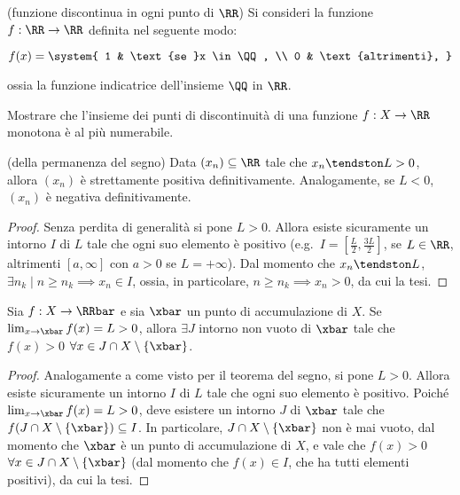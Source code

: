 \documentclass[11pt]{article}
\begin{document}

	\begin{example} (funzione discontinua in ogni punto di $\RR$) Si consideri la funzione $f : \RR \to \RR$ definita
		nel seguente modo:
	
		\[ f(x) = \system{ 1 & \text{se }x \in \QQ, \\ 0 & \text{altrimenti}, } \]
		
		\vskip 0.05in
		
		ossia la funzione indicatrice dell'insieme $\QQ$ in $\RR$.
		
	\end{example}

	\begin{exercise}
		Mostrare che l'insieme dei punti di discontinuità di una funzione $f : X \to \RR$ monotona è al più
		numerabile.
	\end{exercise}

	
	\begin{theorem} (della permanenza del segno)
		Data $(x_n) \subseteq \RR$ tale che $x_n \tendston L > 0$, allora
		$(x_n)$ è strettamente positiva definitivamente. Analogamente, se $L < 0$,
		$(x_n)$ è negativa definitivamente.
	\end{theorem}

	\begin{proof}
		Senza perdita di generalità si pone $L > 0$. Allora esiste sicuramente un intorno $I$ di $L$ tale che ogni suo elemento è positivo (e.g.~$I = [\frac{L}{2}, \frac{3L}{2}]$, se $L \in \RR$, altrimenti $[a, \infty]$ con $a > 0$ se $L = +\infty$). Dal momento che $x_n \tendston L$, $\exists n_k \mid n \geq n_k \implies x_n \in I$,
		ossia, in particolare, $n \geq n_k \implies x_n > 0$, da cui la tesi.
	\end{proof}

	\begin{proposition}
		Sia $f : X \to \RRbar$ e sia $\xbar$ un punto di accumulazione di $X$. Se $\lim_{x \to \xbar} f(x) = L > 0$,
		allora $\exists J$ intorno non vuoto di $\xbar$ tale che $f(x) > 0$ $\forall x \in J \cap X \setminus \{\xbar\}$.
	\end{proposition}

	\begin{proof}
		Analogamente a come visto per il teorema del segno, si pone $L > 0$. Allora esiste sicuramente un intorno $I$ di $L$ tale che ogni suo elemento è positivo. Poiché $\lim_{x \to \xbar} f(x) = L > 0$, deve esistere un intorno $J$ di
		$\xbar$ tale che $f(J \cap X \setminus \{\xbar\}) \subseteq I$. In particolare, $J \cap X \setminus \{\xbar\}$ non
		è mai vuoto, dal momento che $\xbar$ è un punto di accumulazione di $X$, e vale che $f(x) > 0$ $\forall x \in J \cap X \setminus \{\xbar\}$ (dal momento che $f(x) \in I$, che ha tutti elementi positivi), da cui la tesi.
	\end{proof}
	
\end{document}
